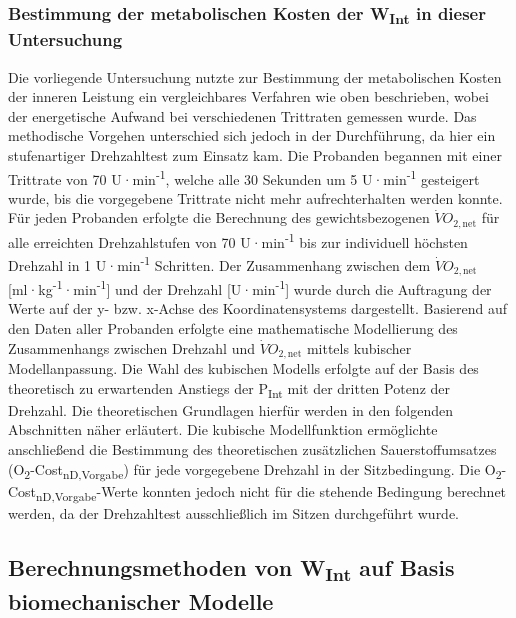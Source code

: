 \documentclass[
  letterpaper,
  DIV=11]{scrartcl}
\begin{document}
\subsubsection{\texorpdfstring{Bestimmung der metabolischen Kosten der
W\textsubscript{Int} in dieser
Untersuchung}{Bestimmung der metabolischen Kosten der WInt in dieser Untersuchung}}\label{bestimmung-der-metabolischen-kosten-der-wint-in-dieser-untersuchung}

Die vorliegende Untersuchung nutzte zur Bestimmung der metabolischen
Kosten der inneren Leistung ein vergleichbares Verfahren wie oben
beschrieben, wobei der energetische Aufwand bei verschiedenen Trittraten
gemessen wurde. Das methodische Vorgehen unterschied sich jedoch in der
Durchführung, da hier ein stufenartiger Drehzahltest zum Einsatz kam.
Die Probanden begannen mit einer Trittrate von 70
U·min\textsuperscript{-1}, welche alle 30 Sekunden um 5
U·min\textsuperscript{-1} gesteigert wurde, bis die vorgegebene
Trittrate nicht mehr aufrechterhalten werden konnte. Für jeden Probanden
erfolgte die Berechnung des gewichtsbezogenen
\(\dot{V}O_{2,\text{net}}\) für alle erreichten Drehzahlstufen von 70
U·min\textsuperscript{-1} bis zur individuell höchsten Drehzahl in 1
U·min\textsuperscript{-1} Schritten. Der Zusammenhang zwischen dem
\(\dot{V}O_{2,\text{net}}\)
{[}ml·kg\textsuperscript{-1}·min\textsuperscript{-1}{]} und der Drehzahl
{[}U·min\textsuperscript{-1}{]} wurde durch die Auftragung der Werte auf
der y- bzw. x-Achse des Koordinatensystems dargestellt. Basierend auf
den Daten aller Probanden erfolgte eine mathematische Modellierung des
Zusammenhangs zwischen Drehzahl und \(\dot{V}O_{2,\text{net}}\) mittels
kubischer Modellanpassung. Die Wahl des kubischen Modells erfolgte auf
der Basis des theoretisch zu erwartenden Anstiegs der
P\textsubscript{Int} mit der dritten Potenz der Drehzahl. Die
theoretischen Grundlagen hierfür werden in den folgenden Abschnitten
näher erläutert. Die kubische Modellfunktion ermöglichte anschließend
die Bestimmung des theoretischen zusätzlichen Sauerstoffumsatzes
(O\textsubscript{2}-Cost\textsubscript{nD,Vorgabe}) für jede vorgegebene
Drehzahl in der Sitzbedingung. Die
O\textsubscript{2}-Cost\textsubscript{nD,Vorgabe}-Werte konnten jedoch
nicht für die stehende Bedingung berechnet werden, da der Drehzahltest
ausschließlich im Sitzen durchgeführt wurde.

\subsection{\texorpdfstring{Berechnungsmethoden von W\textsubscript{Int}
auf Basis biomechanischer
Modelle}{Berechnungsmethoden von WInt auf Basis biomechanischer Modelle}}\label{berechnungsmethoden-von-wint-auf-basis-biomechanischer-modelle}
\end{document}

